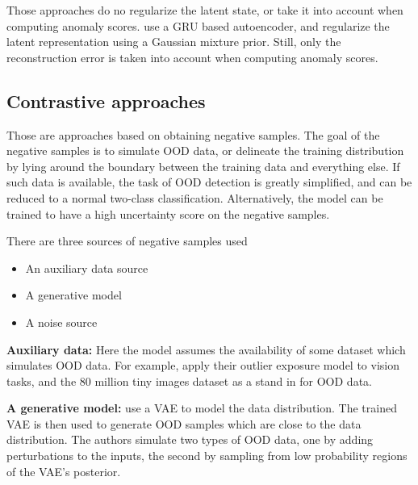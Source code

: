 \documentclass[../main.tex]{subfiles}
\begin{document}
Those approaches do no regularize the latent state, or take it into account when computing anomaly scores. \citet{guo2018multidimensional} use a GRU based autoencoder, and regularize the latent representation using a Gaussian mixture prior. Still, only the reconstruction error is taken into account when computing anomaly scores.


\subsection{Contrastive approaches}
Those are approaches based on obtaining negative samples. The goal of the negative samples is to simulate OOD data, or delineate the training distribution by lying around the boundary between the training data and everything else. 
If such data is available, the task of OOD detection is greatly simplified, and can be reduced to a normal two-class classification. Alternatively, the model can be trained to have a high uncertainty score on the negative samples. 

There are three sources of negative samples used
\begin{itemize}
    \item An auxiliary data source
    \item A generative model
    \item A noise source
\end{itemize}{}

\textbf{Auxiliary data:} Here the model assumes the availability of some dataset which simulates OOD data. For example, \citet{hendrycks2018deep} apply their outlier exposure model to vision tasks, and the 80 million tiny images\citep{torralba200880} dataset as a stand in for OOD data.

\textbf{A generative model:} \cite{vernekar} use a VAE to model the data distribution. The trained VAE is then used to generate OOD samples which are close to the data distribution. The authors simulate two types of OOD data, one by adding perturbations to the inputs, the second by sampling from low probability regions of the VAE's posterior.
\end{document}

